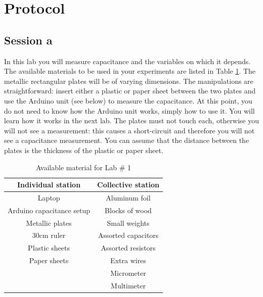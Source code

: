 \documentclass[12pt]{report}
\begin{document}
\section{Protocol}
\subsection{Session a}
In this lab you will measure capacitance and the variables on which it depends. The available materials to be used in your experiments are listed in Table \ref{Tab:Lab1-material}. The metallic rectangular plates will be of varying dimensions. The manipulations are straightforward: insert either a plastic or paper sheet between the two plates and use the Arduino unit (see below) to measure the capacitance. At this point, you do not need to know how the Arduino unit works, simply how to use it. You will learn how it works in the next lab. The plates must not touch each, otherwise you will not see a measurement: this causes a short-circuit and therefore you will not see a capacitance measurement. You can assume that the distance between the plates is the thickness of the plastic or paper sheet.
\begin{table}[h]
\centering
\begin{tabular}{||c | c ||}
\hline
Individual station & Collective station\\ \hline
Laptop & Aluminum foil \\
Arduino capacitance setup & Blocks of wood \\
Metallic plates & Small weights \\
30cm ruler & Assorted capacitors \\
Plastic sheets & Assorted resistors \\
Paper sheets & Extra wires \\
& Micrometer \\
& Multimeter \\
\hline
\end{tabular}
\caption{Available material for Lab \# 1}
\label{Tab:Lab1-material}
\end{table}
\end{document}
